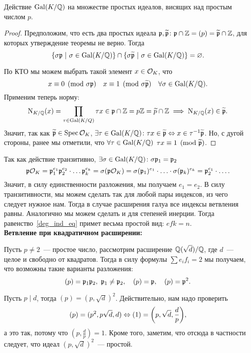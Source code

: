 	\begin{theorem} 
		Действие $\operatorname{Gal}(K/\mathbb{Q})$ на множестве простых идеалов, висящих над простым числом $p$.
	\end{theorem}
	\begin{proof}
		Предположим, что есть два простых идеала $\mathfrak{p}, \widetilde{\mathfrak{p}}\colon \mathfrak{p} \cap \mathbb{Z} = (p) = \widetilde{\mathfrak{p}} \cap \mathbb{Z}$, для которых утверждение теоремы не верно.  Тогда 
		\[
			\{ \sigma \mathfrak{p} \ \vert \ \sigma \in \operatorname{Gal}(K/\mathbb{Q}) \} \cap \{ \sigma \widetilde{\mathfrak{p}} \ \vert \ \sigma \in \operatorname{Gal}(K / \mathbb{Q}) \} = \varnothing.
		\]

		По КТО мы можем выбрать такой элемент $x \in \mathcal{O}_{K}$, что 
		\[
			x \equiv 0 \pmod{\sigma \mathfrak{p}} \quad x \equiv 1 \pmod{\sigma \widetilde{\mathfrak{p}}} \quad \forall \sigma \in \operatorname{Gal}(K/\mathbb{Q}).			
		\]
		Применим теперь норму: 
		\[
			\operatorname{\mathrm{N}}_{K/\mathbb{Q}}(x) = \prod_{\tau \in \operatorname{Gal}(K/Q)}\tau x \in \mathfrak{p} \cap \mathbb{Z} = p\mathbb{Z} = \widetilde{p} \cap \mathbb{Z} \implies \operatorname{\mathrm{N}}_{K/\mathbb{Q}}(x) \in \widetilde{\mathfrak{p}}. 
		\]
		Значит, так как $\widetilde{\mathfrak{p}} \in \operatorname{Spec}{\mathcal{O}_{K}}$, $\exists \tau \in \operatorname{Gal}(K/\mathbb{Q})\colon \tau x \in \widetilde{\mathfrak{p}} \Leftrightarrow x \in \tau^{-1}\widetilde{\mathfrak{p}}$. Но, с дугой стороны, ранее мы отметили, что $\forall \tau \in \operatorname{Gal}(K/\mathbb{Q})$ $\tau x \equiv 1 \pmod{\widetilde{\mathfrak{p}}}$.
	\end{proof}


	Так как действие транзитивно, $\exists \sigma \in \operatorname{Gal}(K/\mathbb{Q}) \colon \sigma\mathfrak{p}_{1} = \mathfrak{p}_{2}$
	\[
		\mathfrak{p} \mathcal{O}_{K} = \mathfrak{p}_{1}^{e_1} \mathfrak{p}_{2}^{e_2} \cdot \ldots \mathfrak{p}_{k}^{e_k} = \sigma(\mathfrak{p} \mathcal{O}_{K}) = \sigma(\mathfrak{p}_{1})^{e_1} \cdot \ldots \cdot \sigma(\mathfrak{p}_{k})^{e_k} = \mathfrak{p}_{2}^{e_{1}} \cdot \ldots. 
	\]
	Значит, в силу единственности разложения, мы получаем $e_{1} = e_{2}$. В силу транзитивности, мы можем сделать так для любой пары индексов, из чего следует нужное нам. Тогда в случае расширения галуа все индексы ветвления равны. Аналогично мы можем сделать и для степеней инерции. Тогда равенство~\eqref{deg_ind_eq} примет весьма простой вид: $e f k = n$.\\


	\noindent\bf{Ветвление при квадратичном расширении:}

	Пусть $p \neq 2$~--- простое число, рассмотрим расширение $\mathbb{Q}(\sqrt{d})/\mathbb{Q}$, где $d$~--- целое и свободно от квадратов. Тогда в силу формулы $\sum e_i f_i = 2$ мы получаем, что возможны такие варианты разложения:
	\[
		(p) = \mathfrak{p}_1 \mathfrak{p}_2, \ \mathfrak{p}_1 \neq \mathfrak{p}_2, \quad (p) = \mathfrak{p}, \quad (p) = \mathfrak{p}^2.
	\]

	Пусть $p \mid d$, тогда $(p) = (p, \sqrt{d})^2$. Действительно, нам надо проверить
	\[
		(p) = (p^2, p\sqrt{d}, d) \Leftrightarrow (1) = \lr*{p, \sqrt{d}, \frac{d}{p}},
	\]
	а это так, потому что $(p, \frac{d}{p}) = 1$. Кроме того, заметим, что отсюда в частности следует, что идеал $(p, \sqrt{d})^2$~--- простой. 

